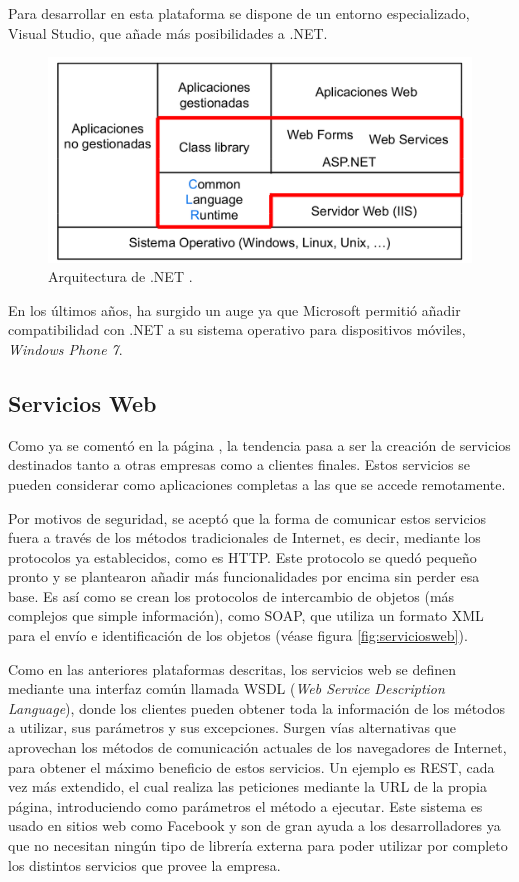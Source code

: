 Para desarrollar en esta plataforma se dispone de un entorno 
especializado, Visual Studio, que añade más posibilidades a .NET.

\begin{figure}
	\centering
	\includegraphics[scale=0.35]{images/dotnet.png}
	\caption[Estructura de .NET]{Arquitectura de .NET \cite{DAD}.}
	\label{fig:dotnet}
\end{figure}

En los últimos años, ha surgido un auge ya que Microsoft permitió 
añadir compatibilidad con .NET a su sistema operativo para 
dispositivos móviles, \emph{Windows Phone 7}.

\subsection{Servicios Web}
Como ya se comentó en la página \pageref{sec:presente}, la tendencia 
pasa a ser la creación de servicios destinados tanto a otras empresas 
como a clientes finales. Estos servicios se pueden considerar como 
aplicaciones completas a las que se accede remotamente.

Por motivos de seguridad, se aceptó que la forma de comunicar estos 
servicios fuera a través de los métodos tradicionales de Internet, es 
decir, mediante los protocolos ya establecidos, como es HTTP. Este 
protocolo se quedó pequeño pronto y se plantearon añadir más 
funcionalidades por encima sin perder esa base. Es así como se crean 
los protocolos de intercambio de objetos (más complejos que simple 
información), como SOAP, que utiliza un formato XML para el envío e 
identificación de los objetos (véase figura \ref{fig:serviciosweb}).

Como en las anteriores plataformas descritas, los servicios web se 
definen mediante una interfaz común llamada WSDL (\emph{Web Service Description Language}), donde los clientes 
pueden obtener toda la información de los métodos a utilizar, sus 
parámetros y sus excepciones. Surgen vías alternativas que aprovechan 
los métodos de comunicación actuales de los 
navegadores de Internet, para obtener el 
máximo beneficio de estos servicios. Un ejemplo es REST, cada vez más 
extendido, el cual realiza las peticiones mediante la URL de la propia 
página, introduciendo como parámetros el método a ejecutar. Este 
sistema es usado en sitios web como Facebook y son de gran ayuda a los 
desarrolladores ya que no necesitan ningún tipo de librería externa 
para poder utilizar por completo los distintos servicios que provee la 
empresa.

